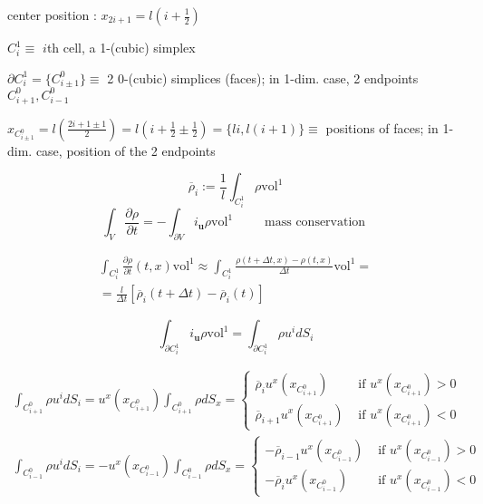 \documentclass[10pt, landscape]{amsart}
\begin{document}
\pagebreak
{\LARGE

center position : $ x_{2i+1} = l(i+\frac{1}{2})$

$C_i^1 \equiv $ $i$th cell, a 1-(cubic) simplex  

$\partial C_i^1 = \lbrace C^0_{i \pm 1} \rbrace \equiv $ 2 $0$-(cubic) simplices (faces); in 1-dim. case, 2 endpoints $C^0_{i+1}, C^0_{i-1}$

$x_{C^0_{i \pm 1} } = l \left( \frac{2i  +1 \pm 1 }{2} \right) = l ( i + \frac{1}{2} \pm \frac{1}{2} ) = \lbrace li, l(i+1) \rbrace \equiv$ positions of faces; in 1-dim. case, position of the 2 endpoints

\[
  \overline{\rho}_i := \frac{1}{l} \int_{C_i^1} \rho \text{vol}^1
\]
\[
\int_V  \frac{ \partial \rho}{ \partial t} = - \int_{\partial V} i_{\mathbf{u}}\rho \text{vol}^1 \qquad \, \text{ mass conservation }
\]


\[
\begin{gathered}
  \int_{C_i^1} \frac{  \partial \rho}{ \partial t}(t,x) \text{vol}^1 \approx \int_{C_i^1} \frac{ \rho(t+\Delta t, x) - \rho(t,x) }{ \Delta t} \text{vol}^1 = \\
  = \frac{l}{\Delta t} \left[ \overline{\rho}_i(t+\Delta t) - \overline{\rho}_i(t) \right]
  \end{gathered}
\]


\[
\int_{\partial C_i^1} i_{\mathbf{u}} \rho \text{vol}^1 = \int_{ \partial C_i^1} \rho u^i dS_i
\]

\[
\begin{gathered}
  \int_{C^0_{i+1}} \rho u^i dS_i = u^x(x_{C^0_{i+1}}) \int_{C^0_{i+1} } \rho dS_x = \begin{cases} 
    \overline{\rho}_iu^x(x_{C^0_{i+1}} ) & \text{ if } u^x(x_{C^0_{i+1}}) > 0 \\
    \overline{\rho}_{i+1}u^x(x_{C^0_{i+1}} ) & \text{ if } u^x(x_{C^0_{i+1}}) < 0
    \end{cases} \\
  \int_{C^0_{i-1}} \rho u^i dS_i = -u^x(x_{C^0_{i-1}}) \int_{C^0_{i-1} } \rho dS_x = \begin{cases} 
    -\overline{\rho}_{i-1}u^x(x_{C^0_{i-1}} ) & \text{ if } u^x(x_{C^0_{i-1}}) > 0 \\
    -\overline{\rho}_{i}u^x(x_{C^0_{i-1}} ) & \text{ if } u^x(x_{C^0_{i-1}}) < 0
    \end{cases} 
\end{gathered}
\]
}


\pagebreak
\end{document}

